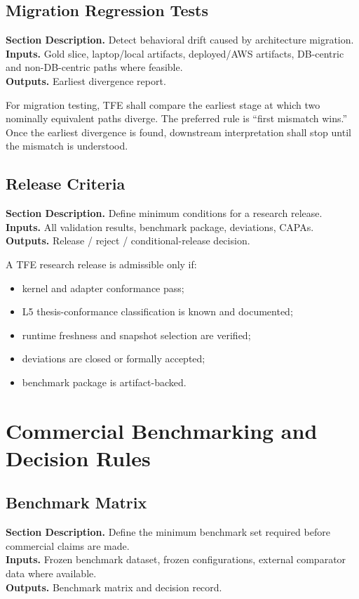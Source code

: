 \documentclass[11pt]{report}
\newcommand{\meta}[3]{\textbf{Section Description.} #1\\
\textbf{Inputs.} #2\\
\textbf{Outputs.} #3\par}
\begin{document}
\section{Migration Regression Tests}
\meta{Detect behavioral drift caused by architecture migration.}{Gold slice, laptop/local artifacts, deployed/AWS artifacts, DB-centric and non-DB-centric paths where feasible.}{Earliest divergence report.}

For migration testing, TFE shall compare the earliest stage at which two nominally equivalent paths diverge. The preferred rule is ``first mismatch wins.'' Once the earliest divergence is found, downstream interpretation shall stop until the mismatch is understood.

\section{Release Criteria}
\meta{Define minimum conditions for a research release.}{All validation results, benchmark package, deviations, CAPAs.}{Release / reject / conditional-release decision.}

A TFE research release is admissible only if:
\begin{itemize}
    \item kernel and adapter conformance pass;
    \item L5 thesis-conformance classification is known and documented;
    \item runtime freshness and snapshot selection are verified;
    \item deviations are closed or formally accepted;
    \item benchmark package is artifact-backed.
\end{itemize}

\chapter{Commercial Benchmarking and Decision Rules}
\section{Benchmark Matrix}
\meta{Define the minimum benchmark set required before commercial claims are made.}{Frozen benchmark dataset, frozen configurations, external comparator data where available.}{Benchmark matrix and decision record.}
\end{document}
